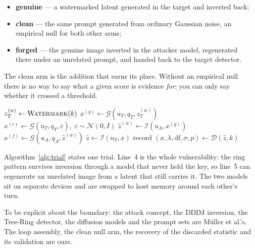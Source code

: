 \documentclass[10pt,twocolumn]{article}
\newcommand{\xstat}{\ensuremath{x}}
\newcommand{\lam}{\ensuremath{\lambda}}
\begin{document}
\begin{itemize}\itemsep2pt
\item \textbf{genuine} --- a watermarked latent generated in the target and inverted
      back;
\item \textbf{clean} --- the same prompt generated from ordinary Gaussian noise, an
      empirical null for both other arms;
\item \textbf{forged} --- the genuine image inverted in the attacker model,
      regenerated there under an unrelated prompt, and handed back to the target
      detector.
\end{itemize}

The clean arm is the addition that earns its place. Without an empirical null there is
no way to say what a given score is evidence \emph{for}; you can only say whether it
crossed a threshold.

\begin{algorithm}[t]
\small
\caption{One measurement trial. $u_T$ is the target, $u_A$ the attacker proxy,
$\mathcal{I}$ inversion, $\mathcal{G}$ generation, $\mathcal{D}$ the Tree-Ring
detector and $k$ the key. Prompts $q_T$ and $q_A$ are unrelated.}
\label{alg:trial}
\begin{algorithmic}[1]
\State $z_T^{(w)} \gets \textsc{Watermark}(k)$ 
\State $x^{(g)} \gets \mathcal{G}(u_T, q_T, z_T^{(w)})$ 
\State $x^{(c)} \gets \mathcal{G}(u_T, q_T, \varepsilon),\;
        \varepsilon \sim \mathcal{N}(0, I)$ 
\State $\hat{z}^{(w)} \gets \mathcal{I}(u_A, x^{(g)})$
\State $x^{(f)} \gets \mathcal{G}(u_A, q_A, \hat{z}^{(w)})$ 
  \State $\hat{z} \gets \mathcal{I}(u_T, x)$
  \State record $(\xstat, \lam, \mathrm{df}, \sigma, p)
         \gets \mathcal{D}(\hat{z}, k)$
\EndFor
\end{algorithmic}
\end{algorithm}

Algorithm~\ref{alg:trial} states one trial. Line~4 is the whole vulnerability: the
ring pattern survives inversion through a model that never held the key, so line~5 can
regenerate an unrelated image from a latent that still carries it. The two models sit
on separate devices and are swapped to host memory around each other's turn.

To be explicit about the boundary: the attack concept, the DDIM inversion, the
Tree-Ring detector, the diffusion models and the prompt sets are M\"uller et al.'s.
The loop assembly, the clean null arm, the recovery of the discarded statistic and its
validation are ours.
\end{document}
